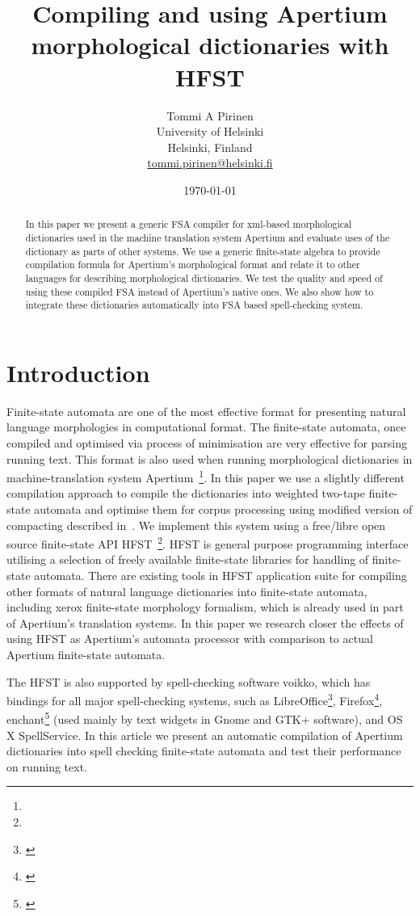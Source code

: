 \documentclass[11pt,a4paper]{article}
\title{Compiling and using Apertium morphological dictionaries with HFST}
\author{Tommi A Pirinen\\
  University of Helsinki\\
  Helsinki, Finland\\
  \url{tommi.pirinen@helsinki.fi}
}
\date{\today}
\begin{document}
\maketitle
\begin{abstract}
    In this paper we present a generic FSA compiler for xml-based morphological
dictionaries used in the machine translation system Apertium and evaluate uses
of the dictionary as parts of other systems. We use a generic finite-state
algebra to provide compilation formula for Apertium's morphological format
and relate it to other languages for describing morphological dictionaries.
We test the quality and speed of using these compiled FSA instead of Apertium's
native ones. We also show how to integrate these dictionaries automatically into
FSA based spell-checking system.
\end{abstract}

\section{Introduction}

Finite-state automata are one of the most effective format for presenting
natural language morphologies in computational format. The finite-state
automata, once compiled and optimised via process of minimisation are very
effective for parsing running text. This format is also used when running
morphological dictionaries in machine-translation system
Apertium~\cite{Apertium/2011}\footnote{}. In this paper we use a slightly
different compilation approach to compile the dictionaries into weighted
two-tape finite-state automata and optimise them for corpus processing using
modified version of compacting described in~\cite{silfverberg/2009/fsmnlp}. We
implement this system using a free/libre open source finite-state API
HFST~\cite{hfst/2011}\footnote{}. HFST is general purpose programming interface
utilising a selection of freely available finite-state libraries for handling
of finite-state automata. There are existing tools in HFST application suite
for compiling other formats of natural language dictionaries into finite-state
automata, including xerox finite-state morphology formalism, which is already
used in part of Apertium's translation systems. In this paper we research
closer the effects of using HFST as Apertium's automata processor with
comparison to actual Apertium finite-state automata.

The HFST is also supported by spell-checking software voikko, which has
bindings for all major spell-checking systems, such as
LibreOffice\footnote{\url{}}, Firefox\footnote{\url{}},
enchant\footnote{\url{}} (used mainly by text widgets in Gnome and GTK+
software), and OS X SpellService. In this article we present an automatic
compilation of Apertium dictionaries into spell checking finite-state automata
and test their performance on running text.
\end{document}
